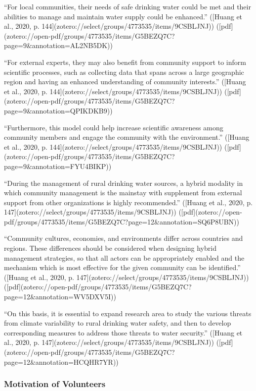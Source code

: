 {“For local communities, their needs of safe drinking water could be met and their abilities to manage and maintain water supply could be enhanced.” ([Huang et al., 2020, p. 144](zotero://select/groups/4773535/items/9CSBLJNJ)) ([pdf](zotero://open-pdf/groups/4773535/items/G5BEZQ7C?page=9&annotation=AL2NB5DK))

“For external experts, they may also benefit from community support to inform scientific processes, such as collecting data that spans across a large geographic region and having an enhanced understanding of community interests.” ([Huang et al., 2020, p. 144](zotero://select/groups/4773535/items/9CSBLJNJ)) ([pdf](zotero://open-pdf/groups/4773535/items/G5BEZQ7C?page=9&annotation=QPIKDKB9))

“Furthermore, this model could help increase scientific awareness among community members and engage the community with the environment.” ([Huang et al., 2020, p. 144](zotero://select/groups/4773535/items/9CSBLJNJ)) ([pdf](zotero://open-pdf/groups/4773535/items/G5BEZQ7C?page=9&annotation=FYU4BIKP))

“During the management of rural drinking water sources, a hybrid modality in which community management is the mainstay with supplement from external support from other organizations is highly recommended.” ([Huang et al., 2020, p. 147](zotero://select/groups/4773535/items/9CSBLJNJ)) ([pdf](zotero://open-pdf/groups/4773535/items/G5BEZQ7C?page=12&annotation=SQ6P8UBN))

“Community cultures, economies, and environments differ across countries and regions. These differences should be considered when designing hybrid management strategies, so that all actors can be appropriately enabled and the mechanism which is most effective for the given community can be identified.” ([Huang et al., 2020, p. 147](zotero://select/groups/4773535/items/9CSBLJNJ)) ([pdf](zotero://open-pdf/groups/4773535/items/G5BEZQ7C?page=12&annotation=WV5DXV5I))

“On this basis, it is essential to expand research area to study the various threats from climate variability to rural drinking water safety, and then to develop corresponding measures to address those threats to water security.” ([Huang et al., 2020, p. 147](zotero://select/groups/4773535/items/9CSBLJNJ)) ([pdf](zotero://open-pdf/groups/4773535/items/G5BEZQ7C?page=12&annotation=HCQHR7YR))

\subsubsection{Motivation of Volunteers} %

}
